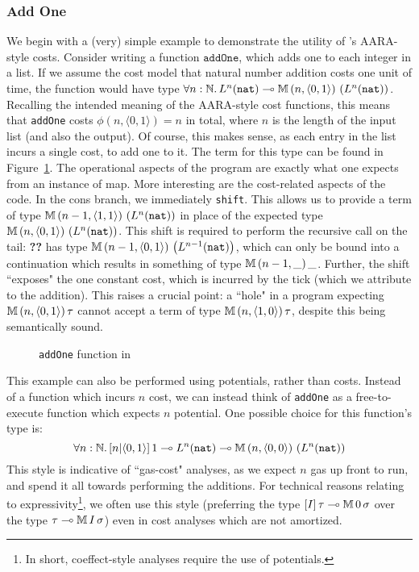 \subsubsection{Add One}

We begin with a (very) simple example to demonstrate the utility of \dlambdaamor's AARA-style costs. Consider writing a function $\texttt{addOne}$, which adds one to each integer in a list. If we assume the cost model that natural number addition costs one unit of time, the function would have type $\forall n : \mathbb{N}. \, L^n(\texttt{nat}) \multimap \mathbb{M} \, (n,\langle 0,1 \rangle) \, \left(L^n(\texttt{nat})\right)$. Recalling the intended meaning of the AARA-style cost functions, this means that \texttt{addOne} costs $\phi(n,\langle 0,1 \rangle) = n$ in total, where $n$ is the length of the input list (and also the output). Of course, this makes sense, as each entry in the list incurs a single cost, to add one to it. The term for this type can be found in Figure~\ref{fig:example-dlambdaamor-addone}. The operational aspects of the program are exactly what one expects from an instance of map. More interesting are the cost-related aspects of the code. In the cons branch, we immediately \texttt{shift}. This allows us to provide a term of type  $\mathbb{M} \, (n-1,\langle 1,1 \rangle) \, \left(L^n(\texttt{nat})\right)$ in place of the expected type $\mathbb{M} \, (n,\langle 0,1 \rangle) \, \left(L^n(\texttt{nat})\right)$. This shift is required to perform the recursive call on the tail: \textbf{??} has type $\mathbb{M} \, (n-1,\langle 0,1 \rangle) \, \left(L^{n-1} (\texttt{nat})\right)$, which can only be bound into a continuation which results in something of type $\mathbb{M} \, (n-1, \_) \, \_$. Further, the shift ``exposes" the one constant cost, which is incurred by the tick (which we attribute to the addition). This raises a crucial point: a ``hole" in a program expecting $\mathbb{M} \, (n,\langle 0,1 \rangle) \, \tau$ cannot accept a term of type $\mathbb{M} \, (n, \langle 1,0 \rangle) \, \tau$, despite this being semantically sound.

\begin{figure}
\label{fig:example-dlambdaamor-addone}
\caption{\texttt{addOne} function in \dlambdaamor}
\end{figure}


This example can also be performed using potentials, rather than costs. Instead of a function which incurs $n$ cost, we can instead think of \texttt{addOne} as a free-to-execute function which expects $n$ potential. One possible choice for this function's type is:
$$\forall n : \mathbb{N} .\, [n|\langle 0,1 \rangle] \, 1 \multimap L^n(\texttt{nat}) \multimap \mathbb{M} \, (n,\langle 0,0 \rangle) \, \left(L^n(\texttt{nat})\right)$$
This style is indicative of ``gas-cost" analyses, as we expect $n$ gas up front to run, and spend it all towards performing the additions. For technical reasons relating to expressivity\footnote{
In short, coeffect-style analyses require the use of potentials.
}, we often use this style (preferring the type $[I] \, \tau \multimap \mathbb{M} \, 0 \, \sigma$ over the type $\tau \multimap \mathbb{M} \, I \, \sigma$) even in cost analyses which are not amortized. 

